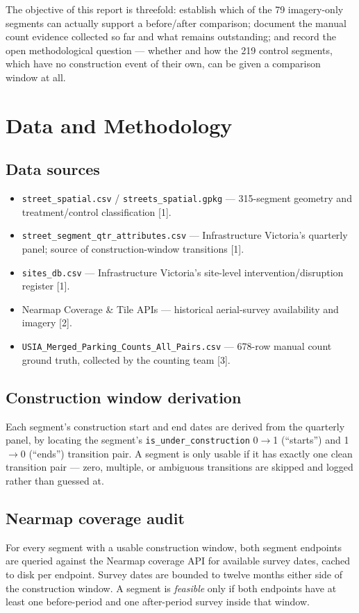 \documentclass[10pt,conference]{IEEEtran}
\begin{document}
The objective of this report is threefold: establish which of the 79 imagery-only segments can actually support a before/after comparison; document the manual count evidence collected so far and what remains outstanding; and record the open methodological question --- whether and how the 219 control segments, which have no construction event of their own, can be given a comparison window at all.

\section{Data and Methodology}
\subsection{Data sources}
\begin{itemize}[leftmargin=*]
\item \texttt{street\_spatial.csv} / \texttt{streets\_spatial.gpkg} --- 315-segment geometry and treatment/control classification [1].
\item \texttt{street\_segment\_qtr\_attributes.csv} --- Infrastructure Victoria's quarterly panel; source of construction-window transitions [1].
\item \texttt{sites\_db.csv} --- Infrastructure Victoria's site-level intervention/disruption register [1].
\item Nearmap Coverage \& Tile APIs --- historical aerial-survey availability and imagery [2].
\item \texttt{USIA\_Merged\_Parking\_Counts\_All\_Pairs.csv} --- 678-row manual count ground truth, collected by the counting team [3].
\end{itemize}

\subsection{Construction window derivation}
Each segment's construction start and end dates are derived from the quarterly panel, by locating the segment's \texttt{is\_under\_construction} 0$\rightarrow$1 (``starts'') and 1$\rightarrow$0 (``ends'') transition pair. A segment is only usable if it has exactly one clean transition pair --- zero, multiple, or ambiguous transitions are skipped and logged rather than guessed at.

\subsection{Nearmap coverage audit}
For every segment with a usable construction window, both segment endpoints are queried against the Nearmap coverage API for available survey dates, cached to disk per endpoint. Survey dates are bounded to twelve months either side of the construction window. A segment is \emph{feasible} only if both endpoints have at least one before-period and one after-period survey inside that window.
\end{document}

